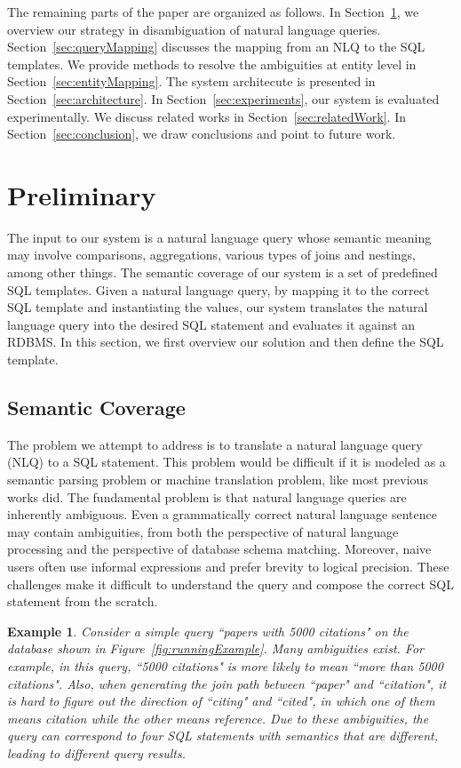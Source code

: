 \documentclass{vldb}
\newtheorem{example}{Example}
\begin{document}
The remaining parts of the paper are organized as follows.  In Section~\ref{sec:overview}, we overview our strategy in disambiguation of natural language queries.  Section~\ref{sec:queryMapping} discusses the mapping from an NLQ to the SQL templates.  We provide methods to resolve the ambiguities at entity level in Section~\ref{sec:entityMapping}.  The system architecute is presented in Section~\ref{sec:architecture}.  In Section~\ref{sec:experiments}, our system is evaluated experimentally.  We discuss related works in Section~\ref{sec:relatedWork}. In Section~\ref{sec:conclusion}, we draw conclusions and point to future work.

\section{Preliminary}
\label{sec:overview}
The input to our system is a natural language query whose semantic meaning may involve comparisons, aggregations, various types of joins and nestings, among other things.  The semantic coverage of our system is a set of predefined SQL templates.  Given a natural language query, by mapping it to the correct SQL template and instantiating the values, our system translates the natural language query into the desired SQL statement and evaluates it against an RDBMS.  In this section, we first overview our solution and then define the SQL template.  

\subsection{Semantic Coverage}
The problem we attempt to address is to translate a natural language query (NLQ) to a SQL statement.  This problem would be difficult if it is modeled as a semantic parsing problem or machine translation problem, like most previous works did.  The fundamental problem is that natural language queries are inherently ambiguous.  Even a grammatically correct natural language sentence may contain ambiguities, from both the perspective of natural language processing and the perspective of database schema matching.  Moreover, naive users often use informal expressions and prefer brevity to logical precision.  These challenges make it difficult to understand the query and compose the correct SQL statement from the scratch.  
\begin{example}
\label{example:semanticCoverage}
Consider a simple query ``papers with 5000 citations" on the database shown in Figure~\ref{fig:runningExample}.  Many ambiguities exist.  For example, in this query, ``5000 citations" is more likely to mean ``more than 5000 citations".  Also, when generating the join path between ``paper" and ``citation", it is hard to figure out the direction of ``citing" and ``cited", in which one of them means citation while the other means reference.  Due to these ambiguities, the query can correspond to four SQL statements with semantics that are different, leading to different query results.
\end{example}
\end{document}

